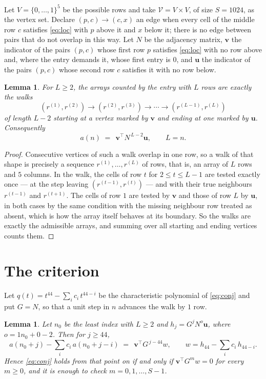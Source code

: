 \documentclass[11pt,a4paper]{article}
\theoremstyle{plain}
\newtheorem{lemma}[theorem]{Lemma}
\theoremstyle{definition}
\begin{document}
Let $V=\{0,\dots,1\}^{5}$ be the possible rows and take
$\mathcal V=V\times V$, of size $S=1024$, as the vertex set. Declare $(p,c)\to(c,x)$ an edge
when every cell of the middle row $c$ satisfies \eqref{eq:loc} with $p$ above it and $x$
below it; there is no edge between pairs that do not overlap in this way. Let $N$ be the
adjacency matrix, $\mathbf{v}$ the indicator of the pairs $(p,c)$ whose first row $p$
satisfies \eqref{eq:loc} with no row above and, where the entry demands it, whose first entry is $0$, and $\mathbf{u}$ the indicator of
the pairs $(p,c)$ whose second row $c$ satisfies it with no row below.

\begin{lemma}\label{lem:walk}
For $L\ge2$, the arrays counted by the entry with $L$ rows are exactly the walks
\[
(r^{(1)},r^{(2)})\to(r^{(2)},r^{(3)})\to\cdots\to(r^{(L-1)},r^{(L)})
\]
of length $L-2$ starting at a vertex marked by $\mathbf{v}$ and ending at one marked by
$\mathbf{u}$. Consequently
\[
a(n)\;=\;\,\mathbf{v}^{\!\top}N^{\,L-2}\mathbf{u},\qquad L=n .
\]
\end{lemma}

\begin{proof}
Consecutive vertices of such a walk overlap in one row, so a walk of that shape is
precisely a sequence $r^{(1)},\dots,r^{(L)}$ of rows, that is, an array of $L$ rows
and $5$ columns. In the walk, the cells of row $t$ for $2\le t\le L-1$ are tested
exactly once --- at the step leaving $(r^{(t-1)},r^{(t)})$ --- and with their true
neighbours $r^{(t-1)}$ and $r^{(t+1)}$. The cells of row $1$ are tested by
$\mathbf{v}$ and those of row $L$ by $\mathbf{u}$, in both cases by the same condition
with the missing neighbour row treated as absent, which is how the array itself behaves at
its boundary. So the walks are exactly the admissible arrays, and summing over all starting
and ending vertices counts them.
\end{proof}

\section{The criterion}

Let $q(t)=t^{44}-\sum_i c_i\,t^{44-i}$ be the characteristic polynomial of
\eqref{eq:conj} and put $G=N$, so that a unit step in $n$ advances the walk by
$1$ row.

\begin{lemma}\label{lem:crit}
Let $n_0$ be the least index with $L\ge2$ and $h_j=G^{j}N^{o}\mathbf{u}$, where
$o=1n_0+0-2$. Then for $j\ge44$,
\[
a(n_0+j)-\sum_i c_i\,a(n_0+j-i)\;=\;\,\mathbf{v}^{\!\top}G^{\,j-44}w,
\qquad w=h_{44}-\sum_i c_i\,h_{44-i} .
\]
Hence \eqref{eq:conj} holds from that point on if and only if
$\mathbf{v}^{\!\top}G^{m}w=0$ for every $m\ge0$, and it is enough to check
$m=0,1,\dots,S-1$.
\end{lemma}
\end{document}
